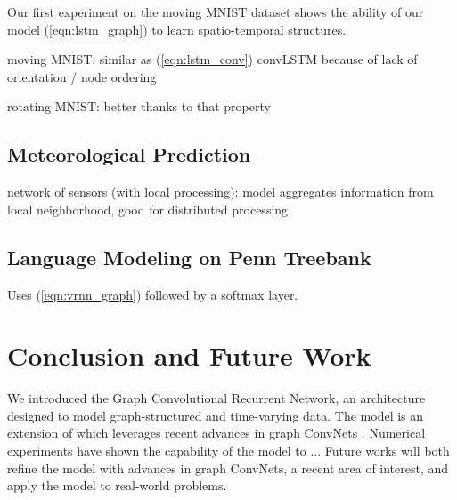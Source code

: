 \documentclass{article} %
\newcommand{\eqnref}[1]{(\ref{eqn:#1})}
\newcommand{\todo}[1]{{\color{red} #1 }}
\begin{document}
Our first experiment on the moving MNIST dataset \citet{moving_mnist} shows the
ability of our model \eqnref{lstm_graph} to learn spatio-temporal structures.

moving MNIST: similar as \eqnref{lstm_conv} convLSTM because of lack of orientation / node ordering

rotating MNIST: better thanks to that property

\subsection{Meteorological Prediction}

network of sensors (with local processing):
model aggregates information from local neighborhood, good for distributed processing.

\subsection{Language Modeling on Penn Treebank}

Uses \eqnref{vrnn_graph} followed by a softmax layer.

\section{Conclusion and Future Work}

We introduced the Graph Convolutional Recurrent Network, an architecture
designed to model graph-structured and time-varying data. The model is an
extension of \citet{convlstm} which leverages recent advances in graph ConvNets
\citep{graphcnn}. Numerical experiments have shown the capability of the model
\todo{to ...}
Future works will both refine the model with advances in graph ConvNets, a recent area of interest, and apply the model to real-world problems.


\newpage


\end{document}

